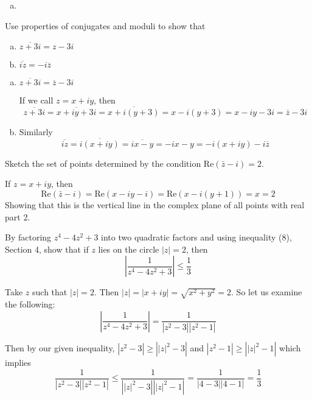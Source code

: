 \documentclass{article}
\begin{document}
\begin{solution}
\begin{enumerate}[(a)]
\item
\end{enumerate}
\end{solution}

\begin{problem}
Use properties of conjugates and moduli to show that
\begin{enumerate}[(a)]
\item $\overline{z+3i} = z-3i$
\item $\overline{iz}=-i\overline{z}$
\end{enumerate}
\end{problem}

\begin{solution}
\begin{enumerate}[(a)]
\item $\overline{z+3i} = \overline{z}-3i$

If we call $z=x+iy$, then 
\[ \overline{z+3i} = \overline{x+iy+3i} = \overline{x+i(y+3)} = x-i(y+3) = x-iy-3i = \overline{z}-3i \]
\item Similarly 
\[ \overline{iz} = \overline{i(x+iy)} = \overline{ix-y} = -ix-y = -i(x+iy) -i\overline{z} \]
\end{enumerate}
\end{solution}

\begin{problem}
Sketch the set of points determined by the condition $\text{Re}(\bar{z}-i)=2$.
\end{problem}

\begin{solution}
If $z=x+iy$, then
\[ \text{Re}(\bar{z}-i)=\text{Re}(x-iy-i)=\text{Re}(x-i(y+1))=x=2 \]
Showing that this is the vertical line in the complex plane of all points with real part 2.
\end{solution}

\begin{problem}
By factoring $z^{4}-4z^{2}+3$ into two quadratic factors and using inequality (8), Section 4, show that if $z$ lies on the circle $|z|=2$, then
\[ \left|\frac{1}{z^{4}-4z^{2}+3}\right| \le \frac{1}{3} \]
\end{problem}

\begin{solution}
Take $z$ such that $|z|=2$. Then $|z|=|x+iy|=\sqrt{x^{2}+y^{2}}=2$. So let us examine the following:
\[ \left|\frac{1}{z^{4}-4z^{2}+3}\right| = \frac{1}{|z^{2}-3||z^{2}-1|} \]

Then by our given inequality, $|z^{2}-3| \ge \left||z|^{2}-3\right|$ and $|z^{2}-1| \ge \left||z|^{2}-1\right|$ which implies
\[ \frac{1}{|z^{2}-3||z^{2}-1|} \le \frac{1}{\left||z|^{2}-3\right|\left||z|^{2}-1\right|} = \frac{1}{\left|4-3\right|\left|4-1\right|} = \frac{1}{3} \]
\end{solution}
\end{document}
